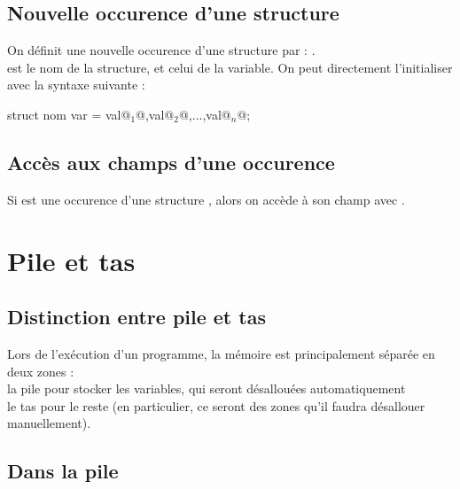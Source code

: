 		\begin{Exemple}
		\end{Exemple}
	
	\subsection{Nouvelle occurence d'une structure}
	
		On définit une nouvelle occurence d'une structure  par : . \\
		 est le nom de la structure, et  celui de la variable. \nt
		On peut directement l'initialiser avec la syntaxe suivante :
			\begin{C}
						struct nom var = {val@$_1$@,val@$_2$@,...,val@$_n$@};
			\end{C}
		
	\subsection{Accès aux champs d'une occurence}
	
		Si  est une occurence d'une structure , alors on accède à son champ  avec .
		
\section{Pile et tas}

	\subsection{Distinction entre pile et tas}
	
		Lors de l'exécution d'un programme, la mémoire est principalement séparée en deux zones : \\
			 \bdot la pile pour stocker les variables, qui seront désallouées automatiquement \\
			 \bdot le tas pour le reste (en particulier, ce seront des zones qu'il faudra désallouer manuellement).
		
		\begin{Illustration}
		\end{Illustration}
	
	\subsection{Dans la pile}
	

